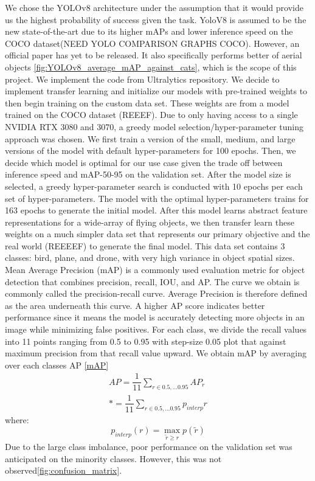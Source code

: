 \documentclass[10pt,twocolumn,letterpaper]{article}
\begin{document}
We chose the YOLOv8 architecture under the assumption that it would provide us the highest probability of success given the task. YoloV8 is 
assumed to be the new state-of-the-art due to its higher mAPs and lower inference speed on the COCO dataset(NEED YOLO COMPARISON GRAPHS COCO). However, an official paper has 
yet to be released. It also specifically performs better of aerial objects \ref{fig:YOLOv8_average_mAP_against_cats}, which is the scope of this project. We implement the code
from Ultralytics repository. We decide to implement transfer learning and initialize our models with pre-trained weights to then begin training on the 
custom data set. These weights are from a model trained on the COCO dataset (REEEF). Due to only having access to a single NVIDIA RTX 3080 and 3070, 
a greedy model selection/hyper-parameter tuning approach was chosen. We first train a version of the small, medium, and large versions of the 
model with default hyper-parameters for 100 epochs. Then, we decide which model is optimal for our use case given the trade off between inference 
speed and mAP-50-95 on the validation set. After the model size is selected, a greedy hyper-parameter search is conducted with 10 epochs per each 
set of hyper-parameters. The model with the optimal hyper-parameters trains for 163 epochs to generate the initial model. After this model learns abstract feature representations for a wide-array of flying objects, we then transfer learn these weights on a much simpler data set that represents our primary objective and the real world (REEEEF) to generate the final model. This data set contains 3 classes: bird, plane, and drone, with very high variance in object spatial sizes.  
Mean Average Precision (mAP) is a commonly used evaluation metric for object detection that combines precision, recall, IOU, and AP. The curve we obtain is commonly called the precision-recall curve. Average Precision is therefore defined as the area underneath this curve. A higher AP score indicates better performance since it means the model is accurately detecting more objects in an image while minimizing false positives.
For each class, we divide the recall values into 11 points ranging from 0.5 to 0.95 with step-size 0.05 plot that against maximum precision from that recall value upward. We obtain mAP by averaging over each classes AP \ref{mAP}\\ 

\begin{align}\label{mAP}
AP=\dfrac{1}{11}\sum_{r\in{0.5,...0.95}}AP_r \\*
=\dfrac{1}{11}\sum_{r\in{0.5,...0.95}}p_{interp}{r}
\end{align}
where:
\begin{equation*}
p_{interp}({r}) = \max_{\widetilde{r}\geq{r}} p(\widetilde{r})
\end{equation*}
Due to the large class imbalance, poor performance on the validation set was anticipated on the minority classes. However, this was not observed\ref{fig:confusion_matrix}.
\end{document}
